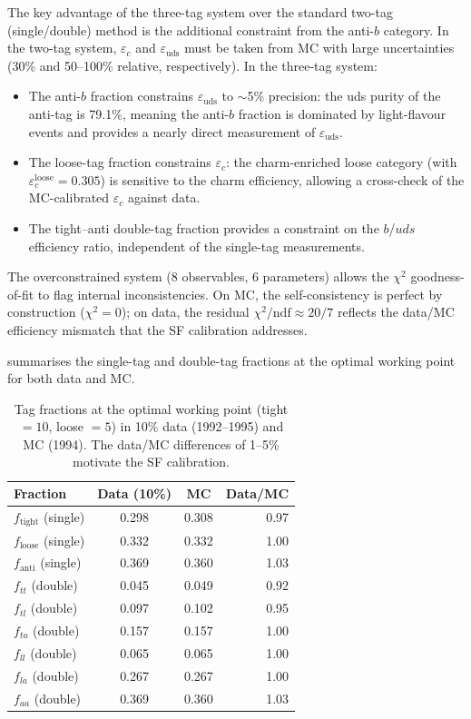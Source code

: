 \documentclass[11pt,a4paper]{article}
\begin{document}
The key advantage of the three-tag system over the standard
two-tag (single/double) method is the additional constraint
from the anti-$b$ category.
In the two-tag system, $\varepsilon_c$ and $\varepsilon_\text{uds}$
must be taken from MC with large uncertainties (30\% and 50--100\%
relative, respectively).
In the three-tag system:
\begin{itemize}
\item The anti-$b$ fraction constrains $\varepsilon_\text{uds}$
  to $\sim$5\% precision: the uds purity of the anti-tag is 79.1\%,
  meaning the anti-$b$ fraction is dominated by light-flavour
  events and provides a nearly direct measurement of
  $\varepsilon_\text{uds}$.
\item The loose-tag fraction constrains $\varepsilon_c$: the
  charm-enriched loose category (with $\varepsilon_c^\text{loose}
  = 0.305$) is sensitive to the charm efficiency, allowing a
  cross-check of the MC-calibrated $\varepsilon_c$ against data.
\item The tight--anti double-tag fraction provides a constraint
  on the $b$/$uds$ efficiency ratio, independent of the
  single-tag measurements.
\end{itemize}

The overconstrained system (8 observables, 6 parameters) allows
the $\chi^2$ goodness-of-fit to flag internal inconsistencies.
On MC, the self-consistency is perfect by construction
($\chi^2 = 0$); on data, the residual $\chi^2/\text{ndf}
\approx 20/7$ reflects the data/MC efficiency mismatch that the
SF calibration addresses.

 summarises the single-tag and double-tag
fractions at the optimal working point for both data and MC.

\begin{table}[htbp]
\centering
\caption{Tag fractions at the optimal working point
(tight $= 10$, loose $= 5$) in 10\% data (1992--1995) and
MC (1994). The data/MC differences of 1--5\% motivate the
SF calibration.}
\label{tbl:working_points}
\begin{tabular}{lccr}
\toprule
Fraction & Data (10\%) & MC & Data/MC \\
\midrule
$f_\text{tight}$ (single) & 0.298 & 0.308 & 0.97 \\
$f_\text{loose}$ (single) & 0.332 & 0.332 & 1.00 \\
$f_\text{anti}$ (single) & 0.369 & 0.360 & 1.03 \\
\midrule
$f_{tt}$ (double) & 0.045 & 0.049 & 0.92 \\
$f_{tl}$ (double) & 0.097 & 0.102 & 0.95 \\
$f_{ta}$ (double) & 0.157 & 0.157 & 1.00 \\
$f_{ll}$ (double) & 0.065 & 0.065 & 1.00 \\
$f_{la}$ (double) & 0.267 & 0.267 & 1.00 \\
$f_{aa}$ (double) & 0.369 & 0.360 & 1.03 \\
\bottomrule
\end{tabular}
\end{table}
\end{document}
